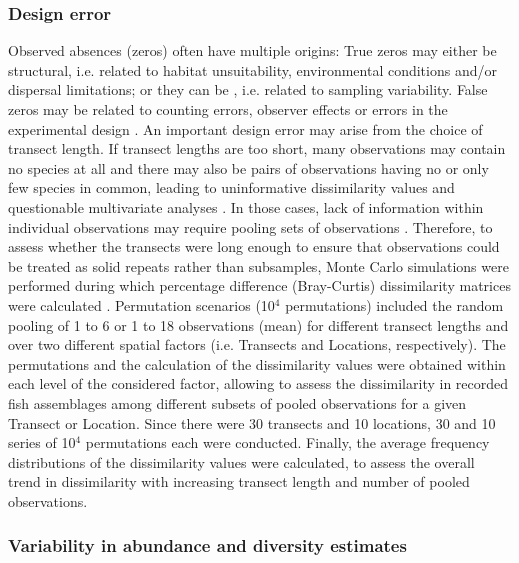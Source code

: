 \documentclass[10pt,letterpaper]{article}
\begin{document}
\subsubsection{Design error}
\label{mandm:designerror}

Observed absences (zeros) often have multiple origins: True zeros may either be structural, i.e. related to habitat unsuitability, environmental conditions and/or dispersal limitations; or they can be , i.e. related to sampling variability. False zeros may be related to counting errors, observer effects or errors in the experimental design \cite{Blasco-Moreno2019}. An important design error may arise from the choice of transect length. If transect lengths are too short, many observations may contain no species at all and there may also be pairs of observations having no or only few species in common, leading to uninformative dissimilarity values and questionable multivariate analyses \cite{Clarke2006,McCormick1987EstimatingStrip-transects}. In those cases, lack of information within individual observations may require pooling sets of observations \cite{Anderson2015}. Therefore, to assess whether the transects were long enough to ensure that observations could be treated as solid repeats rather than subsamples, Monte Carlo simulations were performed during which percentage difference (Bray-Curtis) dissimilarity matrices were calculated \cite{Anderson2015}. Permutation scenarios (10$^{4}$ permutations) included the random pooling of 1 to 6 or 1 to 18 observations (mean) for different transect lengths and over two different spatial factors (i.e. Transects and Locations, respectively). The permutations and the calculation of the dissimilarity values were obtained within each level of the considered factor, allowing to assess the dissimilarity in recorded fish assemblages among different subsets of pooled observations for a given Transect or Location. Since there were 30 transects and 10 locations, 30 and 10 series of 10$^{4}$ permutations each were conducted. Finally, the average frequency distributions of the dissimilarity values were calculated, to assess the overall trend in dissimilarity with increasing transect length and number of pooled observations.

\subsubsection{Variability in abundance and diversity estimates}
\label{mandm:univar}
\end{document}
